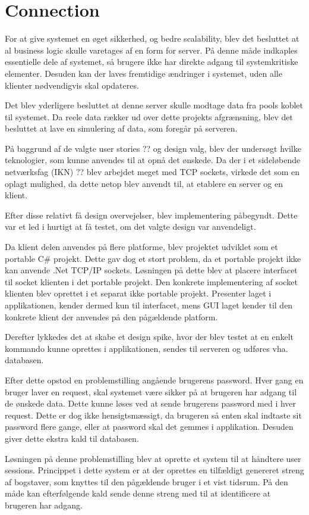 \section{Connection}\label{sec:designconnection}

For at give systemet en øget sikkerhed, og bedre scalability, blev det besluttet at al business logic skulle varetages af en form for server. På denne måde indkaples essentielle dele af systemet, så brugere ikke har direkte adgang til systemkritiske elementer. Desuden kan der laves fremtidige ændringer i systemet, uden alle klienter nødvendigvis skal opdateres.

Det blev yderligere besluttet at denne server skulle modtage data fra pools koblet til systemet. Da reele data rækker ud over dette projekts afgrænsning, blev det besluttet at lave en simulering af data, som foregår på serveren.

På baggrund af de valgte user stories ?? og design valg, blev der undersøgt hvilke teknologier, som kunne anvendes til at opnå det ønskede. Da der i et sideløbende netværksfag (IKN) ?? blev arbejdet meget med TCP sockets, virkede det som en oplagt mulighed, da dette netop blev anvendt til, at etablere en server og en klient.

Efter disse relativt få design overvejelser, blev implementering påbegyndt. Dette var et led i hurtigt at få testet, om det valgte design var anvendeligt. 

Da klient delen anvendes på flere platforme, blev projektet udviklet som et portable C\# projekt. Dette gav dog et stort problem, da et portable projekt ikke kan anvende .Net TCP/IP sockets. Løsningen på dette blev at placere interfacet til socket klienten i det portable projekt. Den konkrete implementering af socket klienten blev oprettet i et separat ikke portable projekt. Presenter laget i applikationen, kender dermed kun til interfacet, mens GUI laget kender til den konkrete klient der anvendes på den pågældende platform.

Derefter lykkedes det at skabe et design spike, hvor der blev testet at en enkelt kommando kunne oprettes i applikationen, sendes til serveren og udføres vha. databasen. 

Efter dette opstod en problemstilling angående brugerens password. Hver gang en bruger laver en request, skal systemet være sikker på at brugeren har adgang til de ønskede data. Dette kunne løses ved at sende brugerens password med i hver request. Dette er dog ikke hensigtsmæssigt, da brugeren så enten skal indtaste sit password flere gange, eller at password skal det gemmes i applikation. Desuden giver dette ekstra kald til databasen. 

Løsningen på denne problemstilling blev at oprette et system til at håndtere user sessions. Princippet i dette system er at der oprettes en tilfældigt genereret streng af bogstaver, som knyttes til den pågældende bruger i et vist tidsrum. På den måde kan efterfølgende kald sende denne streng med til at identificere at brugeren har adgang. 
